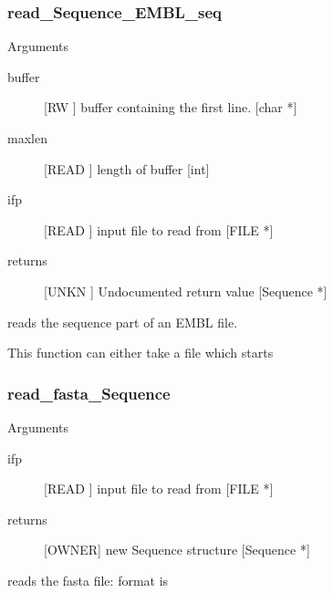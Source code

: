 \subsubsection{read_Sequence_EMBL_seq}

Arguments
\begin{description}
\item[buffer] [RW   ] buffer containing the first line. [char *]
\item[maxlen] [READ ] length of buffer [int]
\item[ifp] [READ ] input file to read from [FILE *]
\item[returns] [UNKN ] Undocumented return value [Sequence *]
\end{description}
reads the sequence part of an EMBL file.


This function can either take a file which 
starts




\subsubsection{read_fasta_Sequence}

Arguments
\begin{description}
\item[ifp] [READ ] input file to read from [FILE *]
\item[returns] [OWNER] new Sequence structure  [Sequence *]
\end{description}
reads the fasta file: format is


